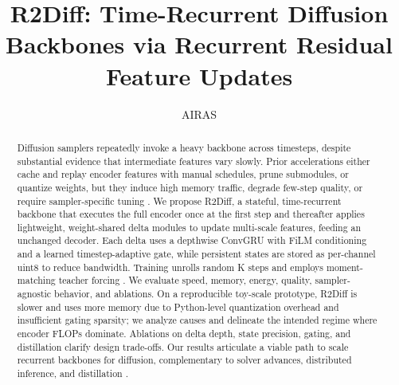 \documentclass{article}
\title{R2Diff: Time-Recurrent Diffusion Backbones via Recurrent Residual Feature Updates}
\author{AIRAS}
\begin{document}
\maketitle

\begin{abstract}
Diffusion samplers repeatedly invoke a heavy backbone across timesteps, despite substantial evidence that intermediate features vary slowly. Prior accelerations either cache and replay encoder features with manual schedules, prune submodules, or quantize weights, but they induce high memory traffic, degrade few-step quality, or require sampler-specific tuning \cite{li-2023-faster,moon-2024-simple,shang-2022-post}. We propose R2Diff, a stateful, time-recurrent backbone that executes the full encoder once at the first step and thereafter applies lightweight, weight-shared delta modules to update multi-scale features, feeding an unchanged decoder. Each delta uses a depthwise ConvGRU with FiLM conditioning and a learned timestep-adaptive gate, while persistent states are stored as per-channel uint8 to reduce bandwidth. Training unrolls random K steps and employs moment-matching teacher forcing \cite{salimans-2024-multistep}. We evaluate speed, memory, energy, quality, sampler-agnostic behavior, and ablations. On a reproducible toy-scale prototype, R2Diff is slower and uses more memory due to Python-level quantization overhead and insufficient gating sparsity; we analyze causes and delineate the intended regime where encoder FLOPs dominate. Ablations on delta depth, state precision, gating, and distillation clarify design trade-offs. Our results articulate a viable path to scale recurrent backbones for diffusion, complementary to solver advances, distributed inference, and distillation \cite{chen-2023-the,li-2024-distrifusion,huang-2024-reverse}.
\end{abstract}
\end{document}
